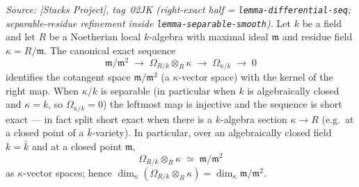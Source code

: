 \begin{lemma}
  \label{lem:cotangent_kahler_over_field}
  \textit{Source: [Stacks Project], tag~02JK (right-exact half = \texttt{lemma-differential-seq}; separable-residue refinement inside \texttt{lemma-separable-smooth}).}
  Let \(k\) be a field and let \(R\) be a Noetherian local
  \(k\)-algebra with maximal ideal \(\mathfrak m\) and residue field
  \(\kappa = R/\mathfrak m\). The canonical exact sequence
  \[
    \mathfrak m / \mathfrak m^2
    \;\longrightarrow\; \Omega_{R/k} \otimes_R \kappa
    \;\longrightarrow\; \Omega_{\kappa / k}
    \;\longrightarrow\; 0
  \]
  identifies the cotangent space \(\mathfrak m / \mathfrak m^2\) (a
  \(\kappa\)-vector space) with the kernel of the right map. When
  \(\kappa / k\) is separable (in particular when \(k\) is
  algebraically closed and \(\kappa = k\), so \(\Omega_{\kappa / k}
  = 0\)) the leftmost map is injective and the sequence is short exact
  --- in fact split short exact when there is a \(k\)-algebra section
  \(\kappa \to R\) (e.g.\ at a closed point of a \(\bar k\)-variety).
  In particular, over an algebraically closed field \(k = \bar k\) and
  at a closed point \(\mathfrak m\),
  \[
    \Omega_{R/k} \otimes_R \kappa \;\simeq\; \mathfrak m / \mathfrak m^2
  \]
  as \(\kappa\)-vector spaces; hence
  \(\dim_\kappa(\Omega_{R/k} \otimes_R \kappa)
   = \dim_\kappa \mathfrak m / \mathfrak m^2\).
\end{lemma}

